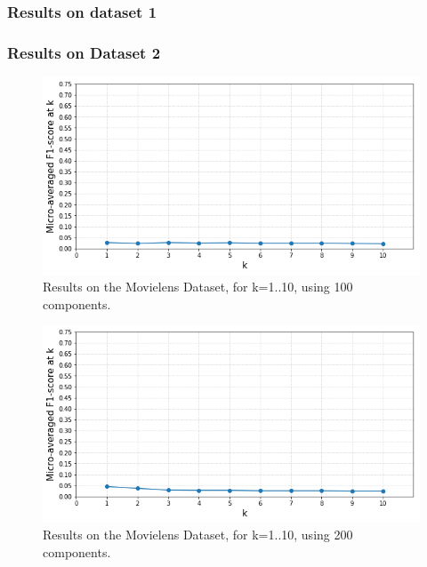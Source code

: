 \subsubsection{Results on dataset 1}

\subsubsection{Results on Dataset 2}

\begin{figure}[!h]
    \centering
    \includegraphics[width=\textwidth]{chapters/05_experiments/images/topic-distances-100d-movielens.png}
    \caption{Results on the Movielens Dataset, for k=1..10, using 100 components.}
    \label{fig:ovr_svm_movielens}
\end{figure}

\begin{figure}[!h]
    \centering
    \includegraphics[width=\textwidth]{chapters/05_experiments/images/topic-distances-200d-movielens.png}
    \caption{Results on the Movielens Dataset, for k=1..10, using 200 components.}
    \label{fig:ovr_svm_movielens}
\end{figure}

